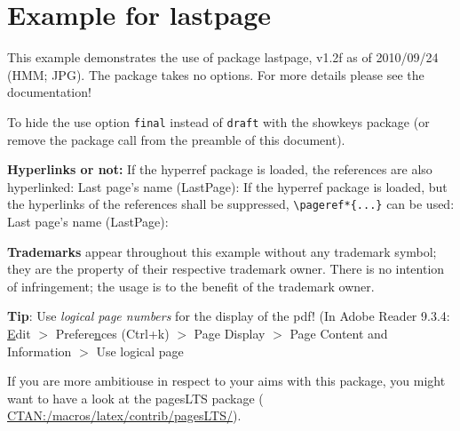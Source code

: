 \documentclass[british]{article}
\begin{document}

\section*{Example for lastpage}

This example demonstrates the use of package\newline
\textsf{lastpage}, v1.2f as of 2010/09/24 (HMM; JPG).\newline
The package takes no options.\newline
For more details please see the documentation!\newline

\noindent \label{keys} To hide the \pageref{keys}{\qquad } use option
\texttt{final} instead of \texttt{draft} with the \textsf{showkeys}
package (or remove the package call from the preamble of
this document).\newline

\textbf{Hyperlinks or not:} If the \textsf{hyperref} package is loaded,
the references are also hyperlinked:\newline
\smallskip
Last page's name (LastPage): \pageref{LastPage}\newline
\noindent If the \textsf{hyperref} package is loaded, but the hyperlinks
of the references shall be suppressed, \texttt{\textbackslash pageref*\{...\}}
can be used:\newline
\smallskip
Last page's name (LastPage): \pageref*{LastPage}\newline

\textbf{Trademarks} appear throughout this example without any
trademark symbol; they are the property of their respective
trademark owner. There is no intention of infringement; the
usage is to the benefit of the trademark owner.\newline

\textbf{Tip}: Use \textit{logical page numbers} for
the display of the pdf!\newline
(In Adobe Reader 9.3.4: \underline{E}dit $>$
Prefere\underline{n}ces (Ctrl+k) $>$ Page Display $>$
Page Content and Information $>$ Use logical page
\newline

If you are more ambitiouse in respect to your aims with this package,
you might want to have a look at the \textsf{pagesLTS} package\newline
(\href{http://www.ctan.org/tex-archive/macros/latex/contrib/pagesLTS/}{%
CTAN:/macros/latex/contrib/pagesLTS/}).
\end{document}
